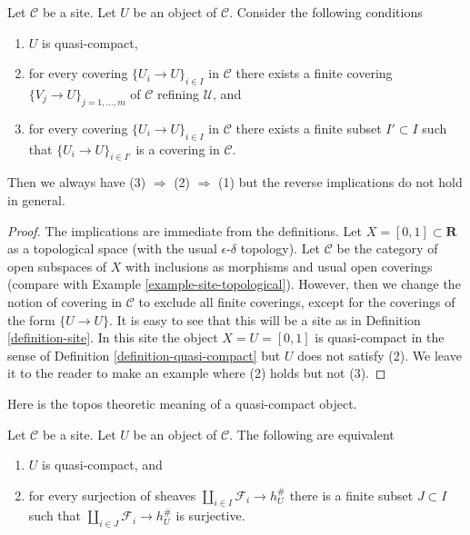 \begin{lemma}
\label{lemma-conclude-quasi-compact}
Let $\mathcal{C}$ be a site. Let $U$ be an object of $\mathcal{C}$.
Consider the following conditions
\begin{enumerate}
\item $U$ is quasi-compact,
\item for every covering $\{U_i \to U\}_{i \in I}$ in $\mathcal{C}$
there exists a finite covering $\{V_j \to U\}_{j = 1, \ldots, m}$
of $\mathcal{C}$ refining $\mathcal{U}$, and
\item for every covering $\{U_i \to U\}_{i \in I}$ in $\mathcal{C}$
there exists a finite subset $I' \subset I$ such that
$\{U_i \to U\}_{i \in I'}$ is a covering in $\mathcal{C}$.
\end{enumerate}
Then we always have (3) $\Rightarrow$ (2) $\Rightarrow$ (1)
but the reverse implications do not hold in general.
\end{lemma}

\begin{proof}
The implications are immediate from the definitions.
Let $X = [0, 1] \subset \mathbf{R}$
as a topological space (with the usual $\epsilon$-$\delta$ topology).
Let $\mathcal{C}$ be the category of open subspaces of $X$ with
inclusions as morphisms and usual open coverings (compare with
Example \ref{example-site-topological}). However, then we change the notion
of covering in $\mathcal{C}$ to exclude all finite coverings, except
for the coverings of the form $\{U \to U\}$. It is easy to see that this
will be a site as in Definition \ref{definition-site}.
In this site the object $X = U = [0, 1]$ is quasi-compact in the sense of
Definition \ref{definition-quasi-compact} but $U$ does not satisfy (2).
We leave it to the reader to make an example where (2) holds but not (3).
\end{proof}

\noindent
Here is the topos theoretic meaning of a quasi-compact object.

\begin{lemma}
\label{lemma-quasi-compact}
Let $\mathcal{C}$ be a site. Let $U$ be an object of $\mathcal{C}$.
The following are equivalent
\begin{enumerate}
\item $U$ is quasi-compact, and
\item for every surjection of sheaves
$\coprod_{i \in I} \mathcal{F}_i \to h_U^\#$
there is a finite subset $J \subset I$ such that
$\coprod_{i \in J} \mathcal{F}_i \to h_U^\#$ is surjective.
\end{enumerate}
\end{lemma}


